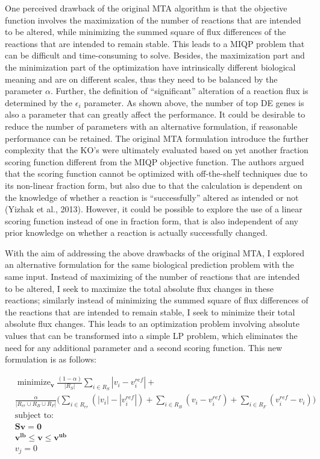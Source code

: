 \documentclass[12pt,twoside,openany,\mydriver]{thesis}  %
\DeclareMathOperator*{\minimize}{minimize}
\begin{document}
One perceived drawback of the original MTA algorithm is that the objective function involves the maximization of the number of reactions that are intended to be altered, while minimizing the summed square of flux differences of the reactions that are intended to remain stable. This leads to a MIQP problem that can be difficult and time-consuming to solve. Besides, the maximization part and the minimization part of the optimization have intrinsically different biological meaning and are on different scales, thus they need to be balanced by the parameter \(\alpha\). Further, the definition of ``significant'' alteration of a reaction flux is determined by the \(\epsilon_i\) parameter. As shown above, the number of top DE genes is also a parameter that can greatly affect the performance. It could be desirable to reduce the number of parameters with an alternative formulation, if reasonable performance can be retained. The original MTA formulation introduce the further complexity that the KO's were ultimately evaluated based on yet another fraction scoring function different from the MIQP objective function. The authors argued that the scoring function cannot be optimized with off-the-shelf techniques due to its non-linear fraction form, but also due to that the calculation is dependent on the knowledge of whether a reaction is ``successfully'' altered as intended or not (Yizhak et al., 2013). However, it could be possible to explore the use of a linear scoring function instead of one in fraction form, that is also independent of any prior knowledge on whether a reaction is actually successfully changed.

With the aim of addressing the above drawbacks of the original MTA, I explored an alternative formulation for the same biological prediction problem with the same input. Instead of maximizing of the number of reactions that are intended to be altered, I seek to maximize the total absolute flux changes in these reactions; similarly instead of minimizing the summed square of flux differences of the reactions that are intended to remain stable, I seek to minimize their total absolute flux changes. This leads to an optimization problem involving absolute values that can be transformed into a simple LP problem, which eliminates the need for any additional parameter and a second scoring function. This new formulation is as follows:

\[
\begin{aligned}
&\minimize_{\mathbf{v}} \frac{(1-\alpha)}{|R_S|} \sum_{i \in R_S}{|v_i-v_i^{ref}|} + \\
&\frac{\alpha}{|R_{rr} \cup R_B \cup R_F|} \bigg( \sum_{i \in R_{rr}}{(|v_i|-|v_i^{ref}|)} + \sum_{i \in R_B}{(v_i-v_i^{ref})} + \sum_{i \in R_F}{(v_i^{ref}-v_i)} \bigg) \\
&\text{subject to:} \\
&\mathbf{Sv = 0} \\
&\mathbf{v^{lb} \le v \le v^{ub}} \\
&v_j=0 \\
\end{aligned}
\]
\end{document}
